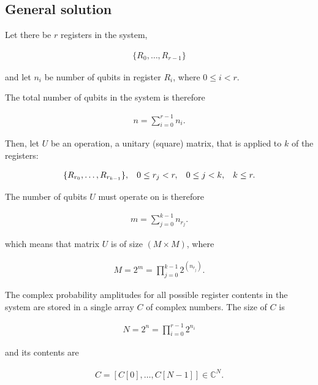 \subsection{General solution}

Let there be $r$ registers in the system, 

\begin{align*}
\{R_0, \dots{}, R_{r-1}\}
\end{align*}

and let $n_i$ be number of qubits in register $R_i$, where $0\leq{}i<r$.

The total number of qubits in the system is therefore

\begin{align*}
    n = \sum\limits_{i=0}^{r-1}n_{i}.
\end{align*}

Then, let $U$ be an operation, a unitary (square) matrix, that is applied to $k$ of the registers:

\begin{align*}
\{R_{r_0},\dots{},R_{r_{k-1}}\},\hspace{3mm} 0\leq{}r_j<r,\hspace{3mm} 0\leq{}j<k,\hspace{3mm} k\leq{}r.
\end{align*}

The number of qubits $U$ must operate on is therefore

\begin{align*}
    m = \sum\limits_{j=0}^{k-1}n_{r_j}.
\end{align*}

which means that matrix $U$ is of size $(M\times{}M)$, where

\begin{align*}
M = 2^m = \prod\limits_{j=0}^{k-1} 2^{(n_{r_j})}.
\end{align*}

The complex probability amplitudes for all possible register contents in the system are stored in a single array $C$ of complex numbers. The size of $C$ is 

\begin{align*}
N = 2^n = \prod\limits_{i=0}^{r-1} 2^{n_i}
\end{align*}

and its contents are

\begin{align*}
C = [C[0],\dots{},C[N-1]] \in{} \mathds{C}^N.
\end{align*}

